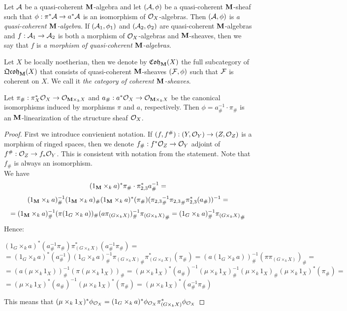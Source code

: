 \begin{definition}
Let ${\mathcal A}$ be a quasi-coherent $\mathbf{M}$-algebra and let $({\mathcal A},\phi)$ be a quasi-coherent $\mathbf{M}$-sheaf such that $\phi:\pi^*{\mathcal A}\rightarrow a^*{\mathcal A}$ is an isomorphism of ${\mathcal O}_X$-algebras. Then $({\mathcal A},\phi)$ is \textit{a quasi-coherent $\mathbf{M}$-algebra}. If $({\mathcal A}_1,\phi_1)$ and $({\mathcal A}_2,\phi_2)$ are quasi-coherent $\mathbf{M}$-algebras and $f:{\mathcal A}_1\rightarrow {\mathcal A}_2$ is both a morphism of ${\mathcal O}_X$-algebras and $\mathbf{M}$-sheaves, then we say that $f$ is \textit{a morphism of quasi-coherent $\mathbf{M}$-algebras}.
\end{definition}
\noindent


\begin{definition}
Let $X$ be locally noetherian, then we denote by $\mathfrak{Coh}_{\mathbf{M}}(X)$ the full subcategory of $\mathfrak{Qcoh}_{\mathbf{M}}(X)$ that consists of quasi-coherent $\mathbf{M}$-sheaves $({\mathcal F},\phi)$ such that ${\mathcal F}$ is coherent on $X$. We call it \textit{the category of coherent $\mathbf{M}$-sheaves}.
\end{definition}

\begin{proposition}\label{proposition:canonical linearization of the structure sheaf}
Let $\pi_{\#}:\pi^*_X{\mathcal O}_X \rightarrow {\mathcal O}_{\mathbf{M} \times_kX}$ and $a_{\#}:a^*{\mathcal O}_X \rightarrow {\mathcal O}_{\mathbf{M} \times_k X}$ be the canonical isomorphisms induced by morphisms $\pi$ and $a$, respectively. Then $\phi  = a_{\#}^{-1}\cdot {\pi}_{\#}$ is an $\mathbf{M}$-linearization of the structure sheaf ${\mathcal O}_X$.
\end{proposition}
\begin{proof}
First we introduce convienient notation. If $(f,f^{\#}):(Y,{\mathcal O}_Y)\rightarrow (Z,{\mathcal O}_Z)$ is a morphism of ringed spaces, then we denote $f_{\#}:f^*{\mathcal O}_Z\rightarrow {\mathcal O}_Y$ adjoint of $f^{\#}:{\mathcal O}_Z\rightarrow f_*{\mathcal O}_Y$. This is consistent with notation from the statement. Note that $f_{\#}$ is always an isomorphism.\\
We have
$$(1_{\mathbf{M}} \times_k a)^*\pi_{\#} \cdot \pi_{2,3}^*a_{\#}^{-1} =$$
$$(1_{\mathbf{M}} \times_ka)_{\#}^{-1}(1_{\mathbf{M}} \times_ka)_{\#}(1_{\mathbf{M}} \times_ka)^*({\pi}_{\#})({\pi_{2,3}}_{\#}^{-1}{\pi_{2,3}}_{\#}\pi_{2,3}^*(a_{\#}))^{-1}= $$ $$=(1_{\mathbf{M}}\times_k a)_{\#}^{-1}(\pi(1_G\times_ka))_{\#}(a\pi_{(G\times_kX)})_{\#}^{-1}{\pi_{(G\times_kX)}}_{\#}=(1_G\times_ka)_{\#}^{-1}{\pi_{(G\times_kX)}}_{\#}$$
Hence:
\begin{center}
$(1_G\times_ka)^*(a_{\#}^{-1}{\pi}_{\#})\pi_{(G\times_kX)}^*(a_{\#}^{-1}{\pi}_{\#})=$\\$=(1_G\times_ka)^*(a_{\#}^{-1})(1_G\times_ka)_{\#}^{-1}{\pi_{(G\times_kX)}}_{\#}\pi_{(G\times_kX)}^*({\pi}_{\#})=(a(1_G\times_ka))_{\#}^{-1}(\pi\pi_{(G\times_kX)})_{\#}=$\\$=(a(\mu\times_k1_X))^{-1}_{\#}(\pi(\mu\times_k1_X))_{\#}=(\mu\times_k1_X)^*(a_{\#})^{-1}(\mu\times_k1_X)^{-1}_{\#}(\mu\times_k1_X)_{\#}(\mu\times_k1_X)^*({\pi}_{\#})=$\\$=(\mu\times_k1_X)^*(a_{\#})^{-1}(\mu\times_k1_X)^*({\pi}_{\#})=(\mu\times_k1_X)^*(a_{\#}^{-1}{\pi}_{\#})$
\end{center}
This means that $(\mu\times_k1_X)^*\phi_{{\mathcal O}_X}=(1_G\times_k a)^*\phi_{{\mathcal O}_X}\pi_{(G\times_kX)}^*\phi_{{\mathcal O}_X}$
\end{proof}

